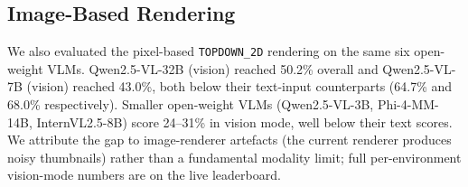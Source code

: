 \documentclass[letterpaper]{article}
\begin{document}
\subsection{Image-Based Rendering}

We also evaluated the pixel-based \texttt{TOPDOWN\_2D} rendering on the same six open-weight VLMs.
Qwen2.5-VL-32B (vision) reached 50.2\% overall and Qwen2.5-VL-7B (vision) reached 43.0\%, both below their text-input counterparts (64.7\% and 68.0\% respectively). Smaller open-weight VLMs (Qwen2.5-VL-3B, Phi-4-MM-14B, InternVL2.5-8B) score 24--31\% in vision mode, well below their text scores.
We attribute the gap to image-renderer artefacts (the current renderer produces noisy thumbnails) rather than a fundamental modality limit; full per-environment vision-mode numbers are on the live leaderboard.
\end{document}
